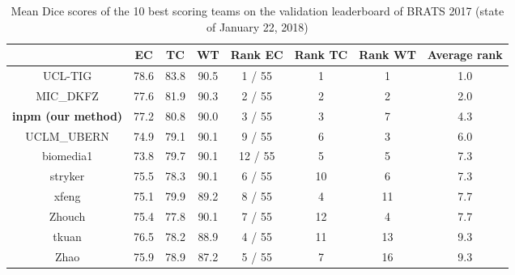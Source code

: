 \documentclass[preprint,12pt]{elsarticle}
\begin{document}
\begin{table}[ht!]
\centering
\caption{Mean Dice scores of the 10 best scoring teams on the validation leaderboard of BRATS 2017 (state of January 22, 2018)}
\begin{tabular}{|c|c|c|c|c|c|c|c|}

  \hline
& \scriptsize{EC}& \scriptsize{TC}& \scriptsize{WT}& \scriptsize{Rank EC}& \scriptsize{Rank TC}& \scriptsize{Rank WT}& \scriptsize{Average rank}\\ 
\hline
\scriptsize{UCL-TIG }& \scriptsize{ 78.6 }& \scriptsize{ 83.8 }& \scriptsize{ 90.5 }& \scriptsize{ 1   / 55 }& \scriptsize{ 1 }& \scriptsize{ 1 }& \scriptsize{ 1.0 }\\ 
 \hline 
\scriptsize{MIC\_DKFZ }& \scriptsize{ 77.6 }& \scriptsize{ 81.9 }& \scriptsize{ 90.3 }& \scriptsize{ 2   / 55 }& \scriptsize{ 2 }& \scriptsize{ 2 }& \scriptsize{ 2.0 }\\ 
 \hline 
\scriptsize{\textbf{inpm (our method)} }& \scriptsize{ 77.2 }& \scriptsize{ 80.8 }& \scriptsize{ 90.0 }& \scriptsize{ 3   / 55 }& \scriptsize{ 3 }& \scriptsize{ 7 }& \scriptsize{ 4.3 }\\ 
 \hline 
\scriptsize{UCLM\_UBERN }& \scriptsize{ 74.9 }& \scriptsize{ 79.1 }& \scriptsize{ 90.1 }& \scriptsize{ 9   / 55 }& \scriptsize{ 6 }& \scriptsize{ 3 }& \scriptsize{ 6.0 }\\ 
\hline 
\scriptsize{biomedia1 }& \scriptsize{ 73.8 }& \scriptsize{ 79.7 }& \scriptsize{ 90.1 }& \scriptsize{ 12 / 55 }& \scriptsize{ 5 }& \scriptsize{ 5 }& \scriptsize{ 7.3 }\\ 
 \hline 
\scriptsize{stryker }& \scriptsize{ 75.5 }& \scriptsize{ 78.3 }& \scriptsize{ 90.1 }& \scriptsize{ 6   / 55 }& \scriptsize{ 10 }& \scriptsize{ 6 }& \scriptsize{ 7.3 }\\ 
 \hline 
\scriptsize{xfeng }& \scriptsize{ 75.1 }& \scriptsize{ 79.9 }& \scriptsize{ 89.2 }& \scriptsize{ 8   / 55 }& \scriptsize{ 4 }& \scriptsize{ 11 }& \scriptsize{ 7.7 }\\ 
 \hline 
\scriptsize{Zhouch }& \scriptsize{ 75.4 }& \scriptsize{ 77.8 }& \scriptsize{ 90.1 }& \scriptsize{ 7   / 55 }& \scriptsize{ 12 }& \scriptsize{ 4 }& \scriptsize{ 7.7 }\\ 
 \hline 
\scriptsize{tkuan }& \scriptsize{ 76.5 }& \scriptsize{ 78.2 }& \scriptsize{ 88.9 }& \scriptsize{ 4   / 55 }& \scriptsize{ 11 }& \scriptsize{ 13 }& \scriptsize{ 9.3 }\\ 
 \hline 
\scriptsize{Zhao }& \scriptsize{ 75.9 }& \scriptsize{ 78.9 }& \scriptsize{ 87.2 }& \scriptsize{ 5  / 55 }& \scriptsize{ 7 }& \scriptsize{ 16 }& \scriptsize{ 9.3 }\\ 
 \hline 
\end{tabular}
\label{table_brats}
\end{table}
\end{document}
